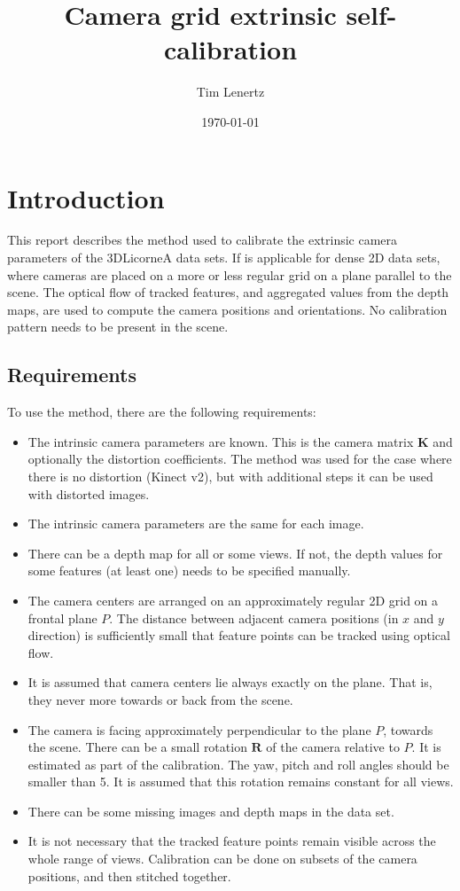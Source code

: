 \documentclass[11pt]{scrreprt}
\title{Camera grid extrinsic self-calibration}
\author{Tim Lenertz}
\date{\today}
\newcommand{\matr}[1]{\mathbf{#1}}
\begin{document}
\maketitle

\tableofcontents

\chapter{Introduction}
This report describes the method used to calibrate the extrinsic camera parameters of the 3DLicorneA data sets. If is applicable for dense 2D data sets, where cameras are placed on a more or less regular grid on a plane parallel to the scene. The optical flow of tracked features, and aggregated values from the depth maps, are used to compute the camera positions and orientations. No calibration pattern needs to be present in the scene.

\section{Requirements}
To use the method, there are the following requirements:
\begin{itemize}
\item The intrinsic camera parameters are known. This is the camera matrix $\matr{K}$ and optionally the distortion coefficients. The method was used for the case where there is no distortion (Kinect v2), but with additional steps it can be used with distorted images.
\item The intrinsic camera parameters are the same for each image.
\item There can be a depth map for all or some views. If not, the depth values for some features (at least one) needs to be specified manually.
\item The camera centers are arranged on an approximately regular 2D grid on a frontal plane $P$. The distance between adjacent camera positions (in $x$ and $y$ direction) is sufficiently small that feature points can be tracked using optical flow.
\item It is assumed that camera centers lie always exactly on the plane. That is, they never more towards or back from the scene.
\item The camera is facing approximately perpendicular to the plane $P$, towards the scene. There can be a small rotation $\matr{R}$ of the camera relative to $P$. It is estimated as part of the calibration. The yaw, pitch and roll angles should be smaller than 5\textdegree. It is assumed that this rotation remains constant for all views.
\item There can be some missing images and depth maps in the data set.
\item It is not necessary that the tracked feature points remain visible across the whole range of views. Calibration can be done on subsets of the camera positions, and then stitched together.
\end{itemize}
\end{document}
